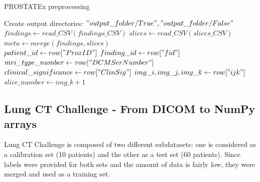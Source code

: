 \begin{algorithm}
    \caption{PROSTATEx preprocessing}
    \label{alg:PROSTATEx_preprocessing}
    \begin{algorithmic}[1] %
        		\State Create output directories: $"output\_folder/True", "output\_folder/False"$\\
        		\State $findings \gets read\_CSV(findings\_CSV)$ 
        		\State $slices \gets read\_CSV(slices\_CSV)$ 
            \State $meta \gets merge(findings, slices)$\\
            		\State $patient\_id \gets row["ProxID"]$
            		\State $finding\_id \gets row["fid"]$
            		\State $mri\_type\_number \gets row["DCMSerNumber"]$
            		\State $clinical\_significance \gets row["ClinSig"]$
            		\State $img\_i, img\_j, img\_k \gets row["ijk"]$
            		\State $slice\_number \gets img\_k + 1$ \\
                						 
                					\EndIf
                				\EndFor
                			\EndIf
            			\EndFor
            		\EndFor
            \EndFor
        \EndProcedure
    \end{algorithmic}
\end{algorithm}



\subsection{Lung CT Challenge - From DICOM to NumPy arrays}

Lung CT Challenge is composed of two different subdatasets: one is considered as a calibration set (10 patients) and the other as a test set (60 patients). Since labels were provided for both sets and the amount of data is fairly low, they were merged and used as a training set. 

